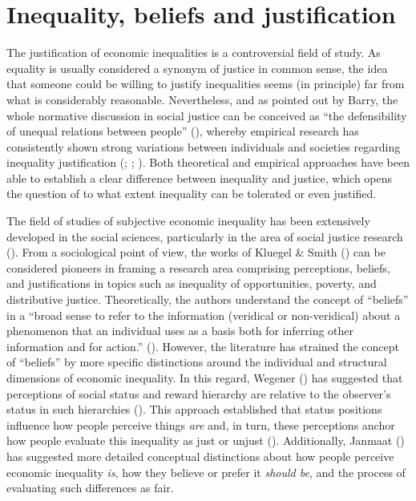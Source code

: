 \documentclass[
  12pt,
  a4paper,
]{article}
\begin{document}
\section{Inequality, beliefs and justification}\label{inequality-beliefs-and-justification}

The justification of economic inequalities is a controversial field of study. As equality is usually considered a synonym of justice in common sense, the idea that someone could be willing to justify inequalities seems (in principle) far from what is considerably reasonable. Nevertheless, and as pointed out by Barry, the whole normative discussion in social justice can be conceived as ``the defensibility of unequal relations between people'' (), whereby empirical research has consistently shown strong variations between individuals and societies regarding inequality justification (; ; ). Both theoretical and empirical approaches have been able to establish a clear difference between inequality and justice, which opens the question of to what extent inequality can be tolerated or even justified.

The field of studies of subjective economic inequality has been extensively developed in the social sciences, particularly in the area of social justice research (). From a sociological point of view, the works of Kluegel \& Smith () can be considered pioneers in framing a research area comprising perceptions, beliefs, and justifications in topics such as inequality of opportunities, poverty, and distributive justice. Theoretically, the authors understand the concept of ``beliefs'' in a ``broad sense to refer to the information (veridical or non-veridical) about a phenomenon that an individual uses as a basis both for inferring other information and for action.'' (). However, the literature has strained the concept of ``beliefs'' by more specific distinctions around the individual and structural dimensions of economic inequality. In this regard, Wegener () has suggested that perceptions of social status and reward hierarchy are relative to the observer's status in such hierarchies (). This approach established that status positions influence how people perceive things \emph{are} and, in turn, these perceptions anchor how people evaluate this inequality as just or unjust (). Additionally, Janmaat () has suggested more detailed conceptual distinctions about how people perceive economic inequality \emph{is}, how they believe or prefer it \emph{should be}, and the process of evaluating such differences as fair.
\end{document}
